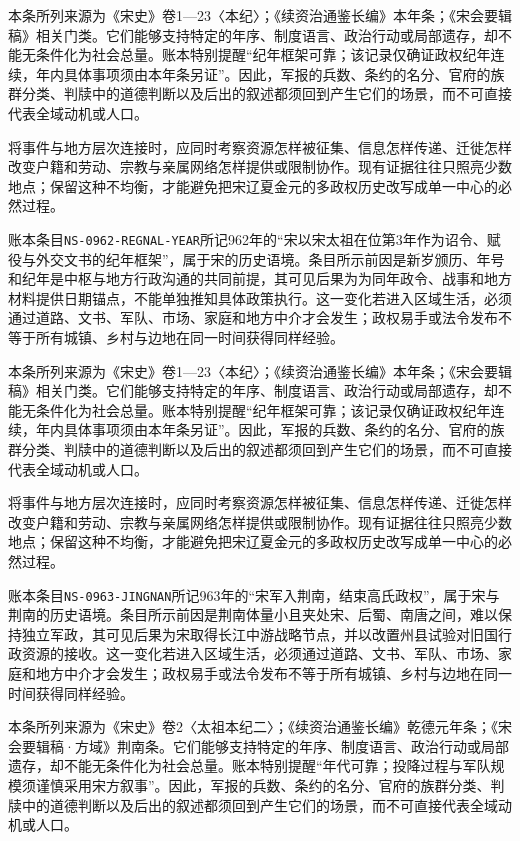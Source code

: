 本条所列来源为《宋史》卷1—23〈本纪〉；《续资治通鉴长编》本年条；《宋会要辑稿》相关门类。它们能够支持特定的年序、制度语言、政治行动或局部遗存，却不能无条件化为社会总量。账本特别提醒“纪年框架可靠；该记录仅确证政权纪年连续，年内具体事项须由本年条另证”。因此，军报的兵数、条约的名分、官府的族群分类、判牍中的道德判断以及后出的叙述都须回到产生它们的场景，而不可直接代表全域动机或人口。

将事件与地方层次连接时，应同时考察资源怎样被征集、信息怎样传递、迁徙怎样改变户籍和劳动、宗教与亲属网络怎样提供或限制协作。现有证据往往只照亮少数地点；保留这种不均衡，才能避免把宋辽夏金元的多政权历史改写成单一中心的必然过程。

账本条目\texttt{NS-0962-REGNAL-YEAR}所记962年的“宋以宋太祖在位第3年作为诏令、赋役与外交文书的纪年框架”，属于宋的历史语境。条目所示前因是新岁颁历、年号和纪年是中枢与地方行政沟通的共同前提，其可见后果为为同年政令、战事和地方材料提供日期锚点，不能单独推知具体政策执行。这一变化若进入区域生活，必须通过道路、文书、军队、市场、家庭和地方中介才会发生；政权易手或法令发布不等于所有城镇、乡村与边地在同一时间获得同样经验。

本条所列来源为《宋史》卷1—23〈本纪〉；《续资治通鉴长编》本年条；《宋会要辑稿》相关门类。它们能够支持特定的年序、制度语言、政治行动或局部遗存，却不能无条件化为社会总量。账本特别提醒“纪年框架可靠；该记录仅确证政权纪年连续，年内具体事项须由本年条另证”。因此，军报的兵数、条约的名分、官府的族群分类、判牍中的道德判断以及后出的叙述都须回到产生它们的场景，而不可直接代表全域动机或人口。

将事件与地方层次连接时，应同时考察资源怎样被征集、信息怎样传递、迁徙怎样改变户籍和劳动、宗教与亲属网络怎样提供或限制协作。现有证据往往只照亮少数地点；保留这种不均衡，才能避免把宋辽夏金元的多政权历史改写成单一中心的必然过程。

账本条目\texttt{NS-0963-JINGNAN}所记963年的“宋军入荆南，结束高氏政权”，属于宋与荆南的历史语境。条目所示前因是荆南体量小且夹处宋、后蜀、南唐之间，难以保持独立军政，其可见后果为宋取得长江中游战略节点，并以改置州县试验对旧国行政资源的接收。这一变化若进入区域生活，必须通过道路、文书、军队、市场、家庭和地方中介才会发生；政权易手或法令发布不等于所有城镇、乡村与边地在同一时间获得同样经验。

本条所列来源为《宋史》卷2〈太祖本纪二〉；《续资治通鉴长编》乾德元年条；《宋会要辑稿·方域》荆南条。它们能够支持特定的年序、制度语言、政治行动或局部遗存，却不能无条件化为社会总量。账本特别提醒“年代可靠；投降过程与军队规模须谨慎采用宋方叙事”。因此，军报的兵数、条约的名分、官府的族群分类、判牍中的道德判断以及后出的叙述都须回到产生它们的场景，而不可直接代表全域动机或人口。

